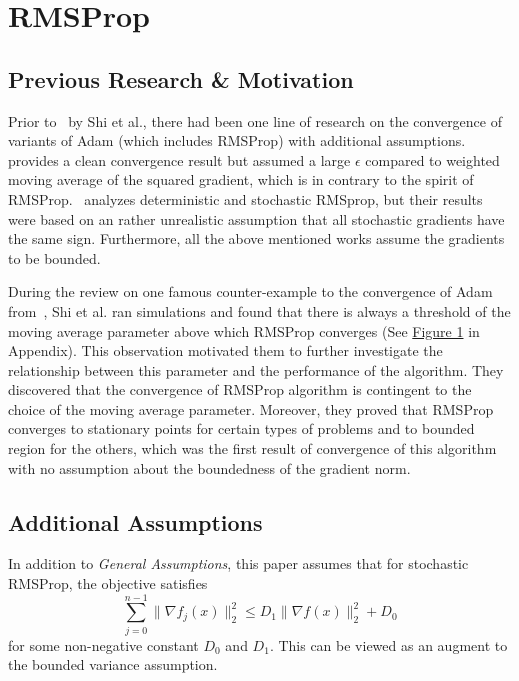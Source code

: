 \documentclass{article}
\begin{document}
\section{RMSProp}
\label{section6}
\setcounter{equation}{0}
\subsection{Previous Research \& Motivation}
Prior to~\cite{shi2021rmsprop} by Shi et al., there had been one line of research on the convergence of variants of Adam (which includes RMSProp) with additional assumptions.~\cite{https://doi.org/10.48550/arxiv.2003.02395} provides a clean convergence result but assumed a large $\epsilon$ compared to  weighted moving average of the squared gradient, which is in contrary to the spirit of RMSProp.~\cite{https://doi.org/10.48550/arxiv.1807.06766} analyzes deterministic and stochastic RMSprop, but their results were based on an rather unrealistic assumption that all stochastic gradients have the same sign. Furthermore, all the above mentioned works assume the gradients to be bounded.

During the review on one famous counter-example to the convergence of Adam from~\cite{https://doi.org/10.48550/arxiv.1904.09237}, Shi et al. ran simulations and found that there is always a threshold of the moving average parameter above which
RMSProp converges (See \hyperref[fig1]{Figure 1} in Appendix). This observation motivated them to further investigate the relationship between this parameter and the performance of the algorithm. They discovered that the convergence of RMSProp algorithm is
contingent to the choice of the moving average parameter. Moreover, they proved that RMSProp converges to stationary points for certain types of problems and to bounded region for the others, which was the first result of convergence
of this algorithm with no assumption about the boundedness of the gradient norm.

\subsection{Additional Assumptions}
In addition to \textit{General Assumptions}, this paper assumes that for stochastic RMSProp, the objective satisfies
\begin{equation}
\label{eq51}
\sum_{j = 0}^{n - 1} \|\nabla f_j(x)\|_2^2 \leq D_1 \|\nabla f(x)\|_2^2 + D_0
\end{equation}
for some non-negative constant $D_0$ and $D_1$. This can be viewed as an augment to the bounded variance assumption.
\end{document}

